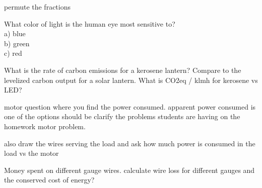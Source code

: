 \documentclass[12pt, oneside]{article}
\begin{document}
permute the fractions














\vfill

\vfill

\vfill

\vfill




\vfill

\vfill

\vfill

What color of light is the human eye most sensitive to? \\
a) blue \\
b) green \\
c) red
\vfill

\problem{}
What is the rate of carbon emissions for a kerosene lantern?  Compare
to the levelized carbon output for a solar lantern.  What is CO2eq /
klmh for kerosene vs LED?

\problem{}
motor question where you find the power consumed.  apparent power
consumed is one of the options
should be clarify the problems students are having on the homework motor problem.

also draw the wires serving the load and ask how much power is consumed
in the load vs the motor

\problem{}
Money spent on different gauge wires.  calculate wire loss for different
gauges and the conserved cost of energy?
\end{document}
